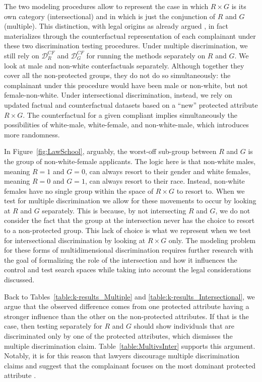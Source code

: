 The two modeling procedures allow to represent the case in which $R \times G$ is its own category (intersectional) and in which is just the conjunction of $R$ and $G$ (multiple).
This distinction, with legal origins as already argued \parencite{Crenshaw1989_DemarginalizingTheIntersection}, in fact materializes through the counterfactual representation of each complainant under these two discrimination testing procedures.
Under multiple discrimination, we still rely on $\mathcal{D}_R^{CF}$ and $\mathcal{D}_G^{CF}$ for running the methods separately on $R$ and $G$. 
We look at male and non-white conterfactuals separately. 
Although together they cover all the non-protected groups, they do not do so simultaneously: the complainant under this procedure would have been male or non-white, but not female-non-white.
%
Under intersectional discrimination, instead, we rely on updated factual and counterfactual datasets based on a ``new'' protected attribute $R \times G$. 
The counterfactual for a given compliant implies simultaneously the possibilities of white-male, white-female, and non-white-male, which introduces more randomness.
 
In Figure~\ref{fig:LawSchool}, arguably, the worst-off sub-group between $R$ and $G$ is the group of non-white-female applicants.
The logic here is that non-white males, meaning $R=1$ and $G=0$, can always resort to their gender and white females, meaning $R=0$ and $G=1$, can always resort to their race.
Instead, non-white females have no single group within the space of $R \times G$ to resort to.
When we test for multiple discrimination we allow for these movements to occur by looking at $R$ and $G$ separately. 
This is because, by not intersecting $R$ and $G$, we do not consider the fact that the group at the intersection never has the choice to resort to a non-protected group. 
This lack of choice is what we represent when we test for intersectional discrimination by looking at $R \times G$ only.
%
The modeling problem for these forms of multidimensional discrimination requires further research with the goal of formalizing the role of the intersection and how it influences the control and test search spaces while taking into account the legal considerations discussed.

Back to Tables~\ref{table:k-results_Multiple} and \ref{table:k-results_Intersectional}, we argue that the observed difference comes from one protected attribute having a stronger influence than the other on the non-protected attributes. 
If that is the case, then testing separately for $R$ and $G$ should show individuals that are discriminated only by one of the protected attributes, which dismisses the multiple discrimination claim.
%
Table~\ref{table:MultivsInter} supports this argument. 
%
Notably, it is for this reason that lawyers discourage multiple discrimination claims and suggest that the complainant focuses on the most dominant protected attribute \parencite{Xenidis2020_TunningEULaw}.

